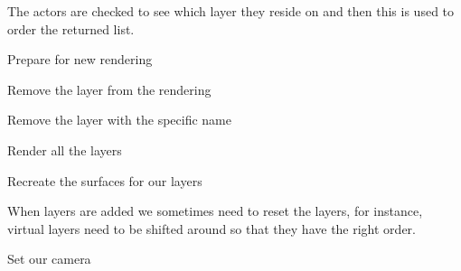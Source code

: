 \documentclass[letterpaper,10pt,english]{sphinxmanual}
\begin{document}
\begin{fulllineitems}
\begin{fulllineitems}
The actors are checked to see which layer they reside on and then
this is used to order the returned list.

\end{fulllineitems}


\begin{fulllineitems}
\label{renderering:serge.render.Renderer.preRender}
Prepare for new rendering

\end{fulllineitems}


\begin{fulllineitems}
\label{renderering:serge.render.Renderer.removeLayer}
Remove the layer from the rendering

\end{fulllineitems}


\begin{fulllineitems}
\label{renderering:serge.render.Renderer.removeLayerNamed}
Remove the layer with the specific name

\end{fulllineitems}


\begin{fulllineitems}
\label{renderering:serge.render.Renderer.render}
Render all the layers

\end{fulllineitems}


\begin{fulllineitems}
\label{renderering:serge.render.Renderer.resetSurfaces}
Recreate the surfaces for our layers

When layers are added we sometimes need to reset the layers,
for instance, virtual layers need to be shifted around so
that they have the right order.

\end{fulllineitems}


\begin{fulllineitems}
\label{renderering:serge.render.Renderer.setCamera}
Set our camera

\end{fulllineitems}


\end{fulllineitems}
\end{document}
